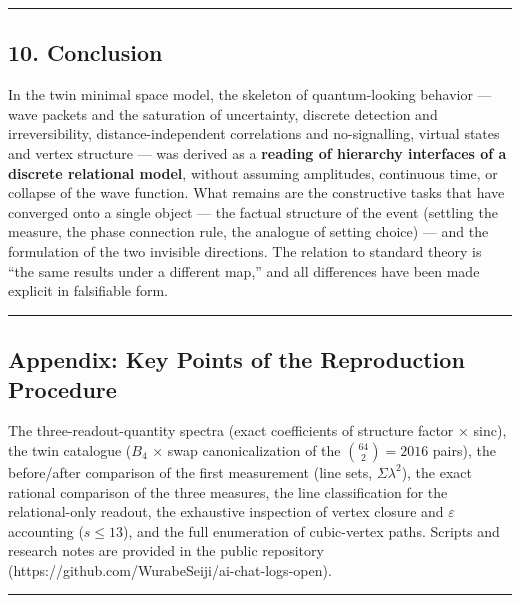 \documentclass[
]{ltjsarticle}
\begin{document}
\begin{center}\rule{0.5\linewidth}{0.5pt}\end{center}

\subsection{10. Conclusion}\label{conclusion}

In the twin minimal space model, the skeleton of quantum-looking
behavior --- wave packets and the saturation of uncertainty, discrete
detection and irreversibility, distance-independent correlations and
no-signalling, virtual states and vertex structure --- was derived as a
\textbf{reading of hierarchy interfaces of a discrete relational model},
without assuming amplitudes, continuous time, or collapse of the wave
function. What remains are the constructive tasks that have converged
onto a single object --- the factual structure of the event (settling
the measure, the phase connection rule, the analogue of setting choice)
--- and the formulation of the two invisible directions. The relation to
standard theory is ``the same results under a different map,'' and all
differences have been made explicit in falsifiable form.

\begin{center}\rule{0.5\linewidth}{0.5pt}\end{center}

\subsection{Appendix: Key Points of the Reproduction
Procedure}\label{appendix-key-points-of-the-reproduction-procedure}

The three-readout-quantity spectra (exact coefficients of structure
factor × sinc), the twin catalogue (\(B_4\) × swap canonicalization of
the \(\binom{64}{2}=2016\) pairs), the before/after comparison of the
first measurement (line sets, \(\Sigma\lambda^2\)), the exact rational
comparison of the three measures, the line classification for the
relational-only readout, the exhaustive inspection of vertex closure and
\(\varepsilon\) accounting (\(s\le13\)), and the full enumeration of
cubic-vertex paths. Scripts and research notes are provided in the
public repository (https://github.com/WurabeSeiji/ai-chat-logs-open).

\begin{center}\rule{0.5\linewidth}{0.5pt}\end{center}
\end{document}

